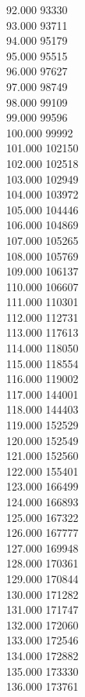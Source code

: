 { 92.000	93330 \\
 93.000	93711 \\
 94.000	95179 \\
 95.000	95515 \\
 96.000	97627 \\
 97.000	98749 \\
 98.000	99109 \\
 99.000	99596 \\
 100.000	99992 \\
 101.000	102150 \\
 102.000	102518 \\
 103.000	102949 \\
 104.000	103972 \\
 105.000	104446 \\
 106.000	104869 \\
 107.000	105265 \\
 108.000	105769 \\
 109.000	106137 \\
 110.000	106607 \\
 111.000	110301 \\
 112.000	112731 \\
 113.000	117613 \\
 114.000	118050 \\
 115.000	118554 \\
 116.000	119002 \\
 117.000	144001 \\
 118.000	144403 \\
 119.000	152529 \\
 120.000	152549 \\
 121.000	152560 \\
 122.000	155401 \\
 123.000	166499 \\
 124.000	166893 \\
 125.000	167322 \\
 126.000	167777 \\
 127.000	169948 \\
 128.000	170361 \\
 129.000	170844 \\
 130.000	171282 \\
 131.000	171747 \\
 132.000	172060 \\
 133.000	172546 \\
 134.000	172882 \\
 135.000	173330 \\
 136.000	173761 \\
}
